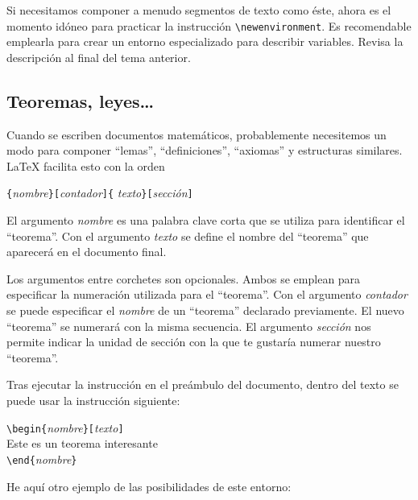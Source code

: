 Si   necesitamos   componer  a   menudo   segmentos   de  texto   como
éste,    ahora   es    el   momento    idóneo   para    practicar   la
instrucción   \verb|\newenvironment|.    Es   recomendable   emplearla
para    crear     un    entorno    especializado     para    describir
variables.   Revisa    la
descripción al final del tema anterior.

\subsection{Teoremas, leyes\ldots}

Cuando se  escriben documentos matemáticos,  probablemente necesitemos
un  modo  para  componer ``lemas'',  ``definiciones'',  ``axiomas''  y
estructuras similares. \LaTeX{} facilita esto con la orden

\begin{command}
\verb|{|\emph{nombre}\verb|}[|\emph{contador}\verb|]{|%
         \emph{texto}\verb|}[|\emph{sección}\verb|]|
\end{command}

El argumento \emph{nombre}  es una palabra clave corta  que se utiliza
para  identificar el  ``teorema''.  Con el  argumento \emph{texto}  se
define el nombre del ``teorema'' que aparecerá en el documento final.

Los argumentos entre  corchetes son opcionales. Ambos  se emplean para
especificar  la  numeración  utilizada  para el  ``teorema''.  Con  el
argumento \emph{contador} se puede  especificar el \emph{nombre} de un
``teorema'' declarado  previamente. El  nuevo ``teorema''  se numerará
con  la  misma  secuencia.  El argumento  \emph{sección}  nos  permite
indicar la  unidad de sección con  la que te gustaría  numerar nuestro
``teorema''.

Tras  ejecutar  la instrucción    en  el preámbulo  del
documento, dentro del texto se puede usar la instrucción siguiente:

\begin{code}
\verb|\begin{|\emph{nombre}\verb|}[|\emph{texto}\verb|]|\\
Este es un teorema interesante\\
\verb|\end{|\emph{nombre}\verb|}|     
\end{code}

He aquí otro ejemplo de las posibilidades de este entorno:

